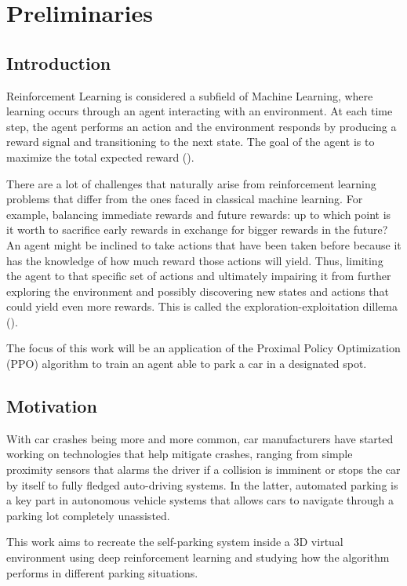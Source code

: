 \chapter{Preliminaries}
\label{cap:introducao}

\section{Introduction}

Reinforcement Learning is considered a subfield of Machine Learning, where learning occurs through an agent interacting with an environment. At each time step, the agent performs an action and the environment responds by producing a reward signal and transitioning to the next state. The goal of the agent is to maximize the total expected reward (\cite{suttonbarto}).

There are a lot of challenges that naturally arise from reinforcement learning problems that differ from the ones faced in classical machine learning. For example, balancing immediate rewards and future rewards: up to which point is it worth to sacrifice early rewards in exchange for bigger rewards in the future? An agent might be inclined to take actions that have been taken before because it has the knowledge of how much reward those actions will yield. Thus, limiting the agent to that specific set of actions and ultimately impairing it from further exploring the environment and possibly discovering new states and actions that could yield even more rewards. This is called the exploration-exploitation dillema (\cite{suttonbarto}).


The focus of this work will be an application of the Proximal Policy Optimization (PPO) algorithm to train an agent able to park a car in a designated spot.

\section{Motivation}
With car crashes being more and more common, car manufacturers have started working on technologies that help mitigate crashes, ranging from simple proximity sensors that alarms the driver if a collision is imminent or stops the car by itself to fully fledged auto-driving systems. In the latter, automated parking is a key part in autonomous vehicle systems that allows cars to navigate through a parking lot completely unassisted.

This work aims to recreate the self-parking system inside a 3D virtual environment using deep reinforcement learning and studying how the algorithm performs in different parking situations. 